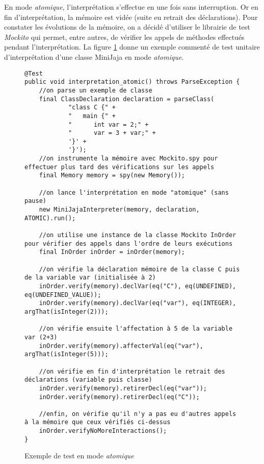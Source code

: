 \documentclass[a4paper,12pt]{article}
\begin{document}
En mode \emph{atomique}, l'interprétation s'effectue en une fois sans interruption. Or en fin d'interprétation, la mémoire est vidée (suite eu retrait des déclarations). Pour constater les évolutions de la mémoire, on a décidé d'utiliser le librairie de test \emph{Mockito} qui permet, entre autres, de vérifier les appels de méthodes effectués pendant l'interprétation. La figure \ref{test_atomic} donne un exemple commenté de test unitaire d'interprétation d'une classe MiniJaja en mode \emph{atomique}.


\begin{figure}[!ht]
\begin{lstlisting}
@Test
public void interpretation_atomic() throws ParseException {
    //on parse un exemple de classe
    final ClassDeclaration declaration = parseClass(
            "class C {" +
            "   main {" +
            "      int var = 2;" +
            "      var = 3 + var;" +
            '}' +
            '}');
    //on instrumente la mémoire avec Mockito.spy pour effectuer plus tard des vérifications sur les appels
    final Memory memory = spy(new Memory());

    //on lance l'interprétation en mode "atomique" (sans pause)
    new MiniJajaInterpreter(memory, declaration, ATOMIC).run();

    //on utilise une instance de la classe Mockito InOrder pour vérifier des appels dans l'ordre de leurs exécutions
    final InOrder inOrder = inOrder(memory);

    //on vérifie la déclaration mémoire de la classe C puis de la variable var (initialisée à 2)
    inOrder.verify(memory).declVar(eq("C"), eq(UNDEFINED), eq(UNDEFINED_VALUE));
    inOrder.verify(memory).declVar(eq("var"), eq(INTEGER), argThat(isInteger(2)));

    //on vérifie ensuite l'affectation à 5 de la variable var (2+3)
    inOrder.verify(memory).affecterVal(eq("var"), argThat(isInteger(5)));

    //on vérifie en fin d'interprétation le retrait des déclarations (variable puis classe)
    inOrder.verify(memory).retirerDecl(eq("var"));
    inOrder.verify(memory).retirerDecl(eq("C"));

    //enfin, on vérifie qu'il n'y a pas eu d'autres appels à la mémoire que ceux vérifiés ci-dessus
    inOrder.verifyNoMoreInteractions();
}
\end{lstlisting}
\caption{Exemple de test en mode \emph{atomique}}
\label{test_atomic}
\end{figure}
\end{document}
